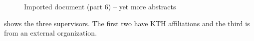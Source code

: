 \begin{figure}[!ht]
  \begin{center}
  \end{center}
  \caption[Imported document (part 6)]{Imported document (part 6) – yet more abstracts}
  \label{fig:divaImport10}
\end{figure}
\FloatBarrier
{} shows the three supervisors. The first two have KTH affiliations and the third is from an external organization.
